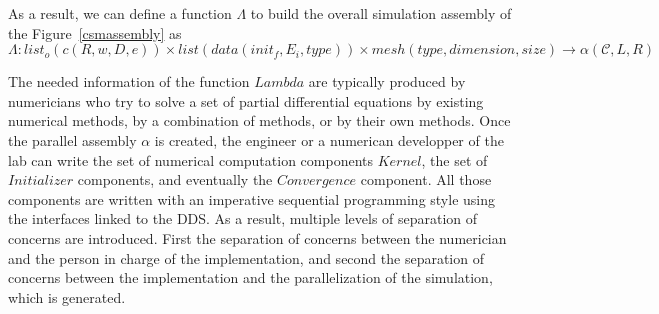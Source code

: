 As a result, we can define a function $\Lambda$ to build the overall simulation assembly of the Figure~\ref{csmassembly} as
\begin{equation}
\Lambda : list_o(c(R,w,D,e)) \times list(data(init_f,E_i,type)) \times mesh(type,dimension,size) \rightarrow \alpha (\mathcal{C},L,R)
\end{equation}

The needed information of the function $Lambda$ are typically produced by numericians who try to solve a set of partial differential equations by existing numerical methods, by a combination of methods, or by their own methods. Once the parallel assembly $\alpha$ is created, the engineer or a numerican developper of the lab can write the set of numerical computation components $Kernel$, the set of $Initializer$ components, and eventually the $Convergence$ component. All those components are written with an imperative sequential programming style using the interfaces linked to the DDS. As a result, multiple levels of separation of concerns are introduced. First the separation of concerns between the numerician and the person in charge of the implementation, and second the separation of concerns between the implementation and the parallelization of the simulation, which is generated.

